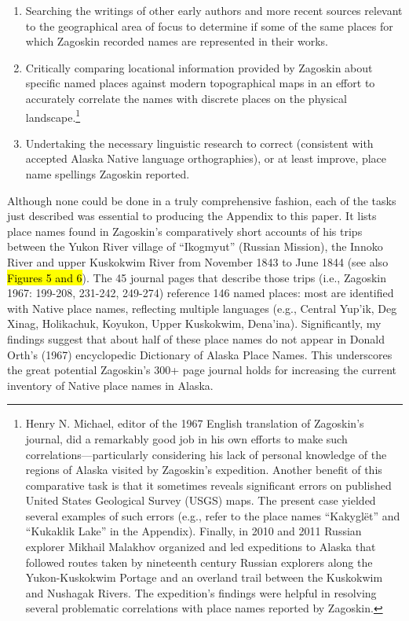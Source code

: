 \begin{enumerate}

    \item  Searching the writings of other early authors and more recent sources relevant to the geographical area of focus to determine if some of the same places for which Zagoskin recorded names are represented in their works.
    \item Critically comparing locational information provided by Zagoskin about specific named places against modern topographical maps in an effort to accurately correlate the names with discrete places on the physical landscape.\footnote{Henry N. Michael, editor of the 1967 English translation of Zagoskin’s journal, did a remarkably good job in his own efforts to make such correlations—particularly considering his lack of personal knowledge of the regions of Alaska visited by Zagoskin’s expedition. Another benefit of this comparative task is that it sometimes reveals significant errors on published United States Geological Survey (USGS) maps. The present case yielded several examples of such errors (e.g., refer to the place names “Kakyglët” and “Kukaklik Lake” in the Appendix). Finally, in 2010 and 2011 Russian explorer Mikhail Malakhov organized and led expeditions to Alaska that followed routes taken by nineteenth century Russian explorers along the Yukon-Kuskokwim Portage and an overland trail between the Kuskokwim and Nushagak Rivers. The expedition’s findings were helpful in resolving several problematic correlations with place names reported by Zagoskin.}
    \item Undertaking the necessary linguistic research to correct (consistent with accepted Alaska Native language orthographies), or at least improve, place name spellings Zagoskin reported.
\end{enumerate}

Although none could be done in a truly comprehensive fashion, each of the tasks just described was essential to producing the Appendix to this paper. It lists place names found in Zagoskin’s comparatively short accounts of his trips between the Yukon River village of “Ikogmyut” (Russian Mission), the Innoko River and upper Kuskokwim River from November 1843 to June 1844 (see also \hl{Figures 5 and 6}). The 45 journal pages that describe those trips (i.e., Zagoskin 1967: 199-208, 231-242, 249-274) reference 146 named places: most are identified with Native place names, reflecting multiple languages (e.g., Central Yup’ik, Deg Xinag, Holikachuk, Koyukon, Upper Kuskokwim, Dena’ina). Significantly, my findings suggest that about half of these place names do not appear in Donald Orth’s (1967) encyclopedic Dictionary of Alaska Place Names. This underscores the great potential Zagoskin’s 300+ page journal holds for increasing the current inventory of Native place names in Alaska.


